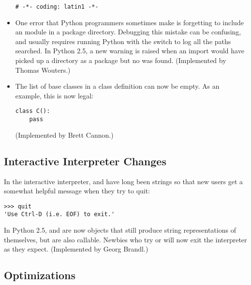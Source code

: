 \documentclass{howto}
\begin{document}
\begin{itemize}
\begin{verbatim}
# -*- coding: latin1 -*-
\end{verbatim}

\item One error that Python programmers sometimes make is forgetting
to include an  module in a package directory.
Debugging this mistake can be confusing, and usually requires running
Python with the  switch to log all the paths searched.
In Python 2.5, a new  warning is raised when
an import would have picked up a directory as a package but no
 was found.  (Implemented by Thomas Wouters.)

\item The list of base classes in a class definition can now be empty.  
As an example, this is now legal:

\begin{verbatim}
class C():
    pass
\end{verbatim}
(Implemented by Brett Cannon.)

\end{itemize}


\subsection{Interactive Interpreter Changes\label{interactive}}

In the interactive interpreter,  and  
have long been strings so that new users get a somewhat helpful message
when they try to quit:

\begin{verbatim}
>>> quit
'Use Ctrl-D (i.e. EOF) to exit.'
\end{verbatim}

In Python 2.5,  and  are now objects that still
produce string representations of themselves, but are also callable.
Newbies who try  or  will now exit the
interpreter as they expect.  (Implemented by Georg Brandl.)


\subsection{Optimizations\label{opts}}
\end{document}
